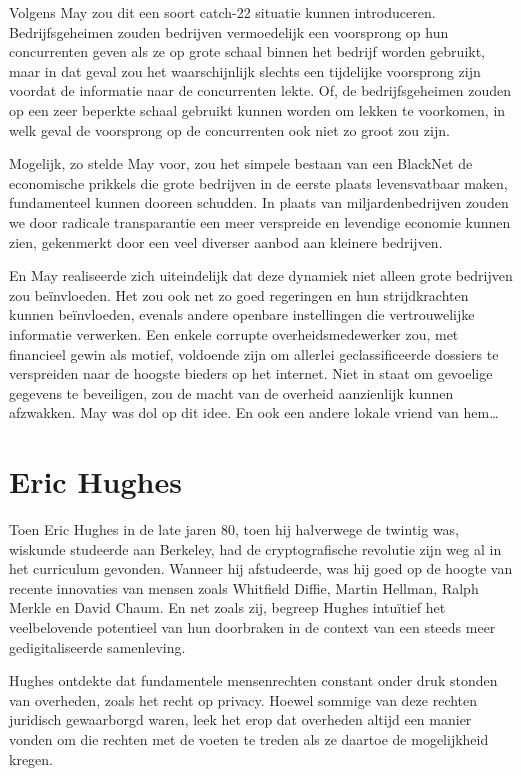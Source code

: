 \documentclass[
  a5paper,
  smalldemyvopaper,11pt,twoside,onecolumn,openright,extrafontsizes,
hidelinks]{memoir}
\begin{document}
Volgens May zou dit een soort catch-22 situatie kunnen introduceren.
Bedrijfsgeheimen zouden bedrijven vermoedelijk een voorsprong op hun
concurrenten geven als ze op grote schaal binnen het bedrijf worden
gebruikt, maar in dat geval zou het waarschijnlijk slechts een
tijdelijke voorsprong zijn voordat de informatie naar de concurrenten
lekte. Of, de bedrijfsgeheimen zouden op een zeer beperkte schaal
gebruikt kunnen worden om lekken te voorkomen, in welk geval de
voorsprong op de concurrenten ook niet zo groot zou zijn.

Mogelijk, zo stelde May voor, zou het simpele bestaan van een BlackNet
de economische prikkels die grote bedrijven in de eerste plaats
levensvatbaar maken, fundamenteel kunnen dooreen schudden. In plaats van
miljardenbedrijven zouden we door radicale transparantie een meer
verspreide en levendige economie kunnen zien, gekenmerkt door een veel
diverser aanbod aan kleinere bedrijven.

En May realiseerde zich uiteindelijk dat deze dynamiek niet alleen grote
bedrijven zou beïnvloeden. Het zou ook net zo goed regeringen en hun
strijdkrachten kunnen beïnvloeden, evenals andere openbare instellingen
die vertrouwelijke informatie verwerken. Een enkele corrupte
overheidsmedewerker zou, met financieel gewin als motief, voldoende zijn
om allerlei geclassificeerde dossiers te verspreiden naar de hoogste
bieders op het internet. Niet in staat om gevoelige gegevens te
beveiligen, zou de macht van de overheid aanzienlijk kunnen afzwakken.
May was dol op dit idee. En ook een andere lokale vriend van hem\ldots{}

\section{Eric Hughes}\label{eric-hughes}

Toen Eric Hughes in de late jaren 80, toen hij halverwege de twintig
was, wiskunde studeerde aan Berkeley, had de cryptografische revolutie
zijn weg al in het curriculum gevonden. Wanneer hij afstudeerde, was hij
goed op de hoogte van recente innovaties van mensen zoals Whitfield
Diffie, Martin Hellman, Ralph Merkle en David Chaum. En net zoals zij,
begreep Hughes intuïtief het veelbelovende potentieel van hun doorbraken
in de context van een steeds meer gedigitaliseerde samenleving.

Hughes ontdekte dat fundamentele mensenrechten constant onder druk
stonden van overheden, zoals het recht op privacy. Hoewel sommige van
deze rechten juridisch gewaarborgd waren, leek het erop dat overheden
altijd een manier vonden om die rechten met de voeten te treden als ze
daartoe de mogelijkheid kregen.
\end{document}
